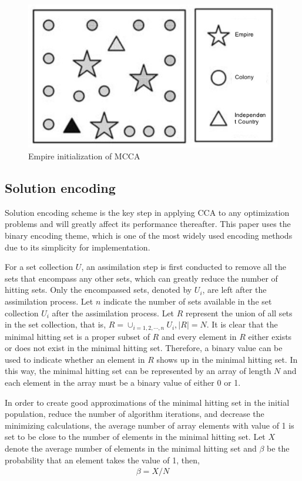 \begin{figure}[h!]
	\begin{center}
		\includegraphics[width=0.5\linewidth]{sections/figure1.jpg}
		\caption{Empire initialization of MCCA}
		\label{fig:fig1}
	\end{center}
\end{figure}


\subsection{Solution encoding}
Solution encoding scheme is the key step in applying CCA to any optimization problems and will greatly affect its performance thereafter.
This paper uses the binary encoding theme, which is one of the most widely used encoding methods due to its simplicity for implementation.

For a set collection $U$, an assimilation step is first conducted to remove all the sets that encompass any other sets, which can greatly reduce the number of hitting sets.
Only the encompassed sets, denoted by $U_i$, are left after the assimilation process. 
Let $n$ indicate the number of sets available in the set collection $U_i$ after the assimilation process.
Let $R$ represent the union of all sets in the set collection, that is, $R = \cup_{i = 1, 2, \cdots, n}U_i, |R| = N$.
It is clear that the minimal hitting set is a proper subset of $R$ and every element in $R$ either exists or does not exist in the minimal hitting set.
Therefore, a binary value can be used to indicate whether an element in $R$ shows up in the minimal hitting set.
In this way, the minimal hitting set can be represented by an array of length $N$ and each element in the array must be a binary value of either 0 or 1.

In order to create good approximations of the minimal hitting set in the initial population, reduce the number of algorithm iterations, and decrease the minimizing calculations, the average number of array elements with value of 1 is set to be close to the number of elements in the minimal hitting set.
Let $X$ denote the average number of elements in the minimal hitting set and $\beta$ be the probability that an element takes the value of 1, then,
\begin{align}
	\beta = X / N
\end{align}

